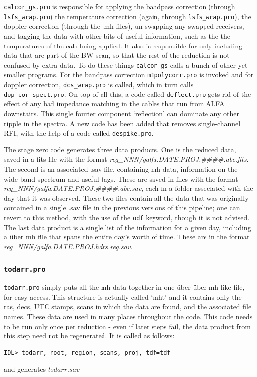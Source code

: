 \documentclass[11pt]{article}
\begin{document}
\texttt{calcor\_gs.pro} is responsible for applying the bandpass correction (through \texttt{lsfs\_wrap.pro}) the temperature correction (again, through \texttt{lsfs\_wrap.pro}), the doppler correction (through the .mh files), un-swapping any swapped receivers, and tagging the data with other bits of useful information, such as the the temperatures of the cals being applied. It also is responsible for only including data that are part of the BW scan, so that the rest of the reduction is not confused by extra data. To do these things \texttt{calcor\_gs} calls a bunch of other yet smaller programs. For the bandpass correction \texttt{m1polycorr.pro} is invoked and for doppler correction, \texttt{dcs\_wrap.pro} is called, which in turn calls \texttt{dop\_cor\_spect.pro}. On top of all this, a code called \texttt{deflect.pro} gets rid of the effect of any bad impedance matching in the cables that run from ALFA downstairs. This single fourier component `reflection' can dominate any other ripple in the spectra. A new code has been added that removes single-channel RFI, with the help of a code called \texttt{despike.pro}.

The stage zero code generates three data products. One is the reduced data, saved in a fits file with the format {\it reg\_NNN/galfa.DATE.PROJ.\#\#\#\#.abc.fits}. The second is an associated .sav file, containing mh data, information on the wide-band spectrum and useful tags. These are saved in files with the format {\it reg\_NNN/galfa.DATE.PROJ.\#\#\#\#.abc.sav}, each in a folder associated with the day that it was observed. These two files contain all the data that was originally contained in a single .sav file in the previous versions of this pipeline; one can revert to this method, with the use of the \texttt{odf} keyword, though it is not advised. The last data product is a single list of the information for a given day, including a \"uber mh file that spans the entire day's worth of time. These are in the format {\it reg\_NNN/galfa.DATE.PROJ.hdrs.reg.sav}.

\subsubsection{\texttt{todarr.pro}}
\texttt{todarr.pro} simply puts all the mh data together in one \"uber-\"uber mh-like file, for easy access. This structure is actually called `mht' and it contains only the ras, decs, UTC stamps, scans in which the data are found, and the associated file names. These data are used in many places throughout the code. This code needs to be run only once per reduction - even if later steps fail, the data product from this step need not be regenerated. It is called as follows:
\begin{verbatim}
IDL> todarr, root, region, scans, proj, tdf=tdf
\end{verbatim}
and generates $todarr.sav$
\end{document}
